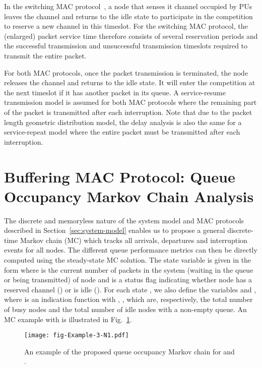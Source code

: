 \documentclass[12pt,journal,oneside,onecolumn]{IEEEtran}
\begin{document}
In the switching MAC protocol~\cite{park11}, a node that senses it channel occupied by PUs leaves the channel and returns to the idle state to participate in the competition to reserve a new channel in this timeslot. For the switching MAC protocol, the (enlarged) packet service time  therefore consists of several reservation periods and the successful transmission and unsuccessful transmission timeslots required to transmit the entire packet.

 For both MAC protocols, once the packet transmission is terminated, the node releases the channel and returns to the idle state. It will enter the competition at the next timeslot if it has another packet in its queue. A service-resume transmission model is assumed for both MAC protocols where the remaining part of the packet is transmitted after each interruption. Note that due to the packet length geometric distribution model, the delay analysis is also the same for a service-repeat model where the entire packet must be transmitted after each interruption.
 

\section{Buffering MAC Protocol: Queue Occupancy Markov Chain Analysis}
\label{sec:Queue-Occupancy}
The discrete and memoryless nature of the system model and MAC protocols described in Section~\ref{sec:system-model} 
enables us to propose a general discrete-time Markov chain (MC) which tracks all arrivals, departures and 
interruption events for all nodes. The different queue performance metrics can then be directly computed using the 
steady-state MC solution.  The state variable is given in the form  
where  is the current number of packets in the system (waiting in the queue or being transmitted) 
of node   and  is a status flag indicating whether node  has a reserved channel () or is 
idle (). For each state , we also define the variables  and , 
where  is an indication function with , , which are, respectively, the total number of busy 
nodes and the total number of idle nodes with a non-empty queue. An MC example with  is illustrated in Fig.~\ref{fig-Example-3-N1.pdf}. 
\begin{figure}\texttt{[image: fig-Example-3-N1.pdf]}\caption{An example of the proposed queue occupancy Markov chain for  and .}\label{fig-Example-3-N1.pdf}\end{figure}
\end{document}

